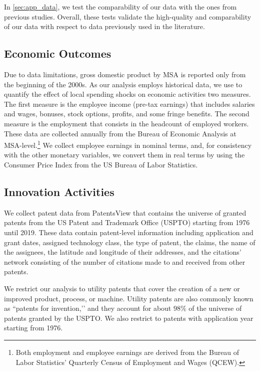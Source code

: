 \documentclass[dv_diss_main.tex]{subfiles}
\begin{document}
In \ref{sec:app_data}, we test the comparability of our data with the ones from previous studies. Overall, these tests validate the high-quality and comparability of our data with respect to data previously used in the literature.


\subsection{Economic Outcomes}
\label{subsec:data_eco}

Due to data limitations, gross domestic product by MSA is reported only from the beginning of the 2000s. As our analysis employs historical data, we use to quantify the effect of local spending shocks on economic activities two measures. The first measure is the employee income (pre-tax earnings) that includes salaries and wages, bonuses, stock options, profits, and some fringe benefits. The second measure is the employment that consists in the headcount of employed workers. These data are collected annually from the Bureau of Economic Analysis at MSA-level.\footnote{Both employment and employee earnings are derived from the Bureau of Labor Statistics’ Quarterly Census of Employment and Wages (QCEW).} We collect  employee earnings in nominal terms, and, for consistency with the other monetary variables, we convert them in real terms by using the Consumer Price Index from the US Bureau of Labor Statistics.


\iffalse
\subsection{Innovation Activities}
\label{subsec:data_inn}

We collect patent data from PatentsView that contains the universe of granted patents from the US Patent and Trademark Office (USPTO) starting from 1976 until 2019. These data contain patent-level information including application and grant dates, assigned technology class, the type of patent, the claims, the name of the assignees, the latitude and longitude of their addresses, and the citations’ network consisting of the number of citations made to and received from other patents. 

We restrict our analysis to utility patents that cover the creation of a new or improved product, process, or machine. Utility patents are also commonly known as ``patents for invention,’’ and they account for about $98\%$ of the universe of patents granted by the USPTO. We also restrict to patents with application year starting from 1976.
\end{document}
